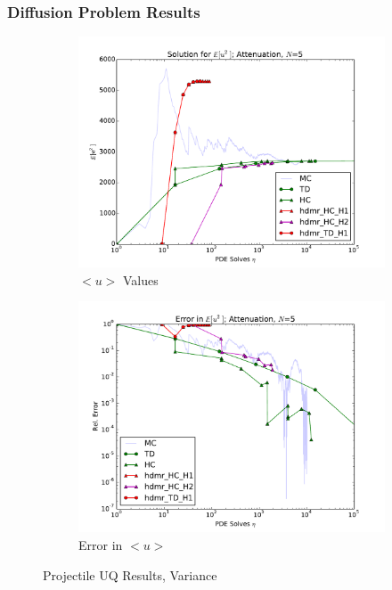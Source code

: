 \documentclass[11pt]{article}
\begin{document}
\subsubsection{Diffusion Problem Results}
\begin{figure}[H]
    \centering
    \begin{subfigure}[b]{0.49 \textwidth}
      \includegraphics[width=\textwidth]{../graphics/projectile_solns_hdmr_variance}
      \caption{$<u>$ Values}
      \label{atn vals hdmr}
  \end{subfigure}
\begin{subfigure}[b]{0.49 \textwidth}
\centering
      \includegraphics[width=\textwidth]{../graphics/projectile_errs_hdmr_variance}
      \caption{Error in $<u>$}
      \label{atn errs hdmr}
    \end{subfigure}
  \caption{Projectile UQ Results, Variance}
  \label{atn results}
  \end{figure}
\end{document}
